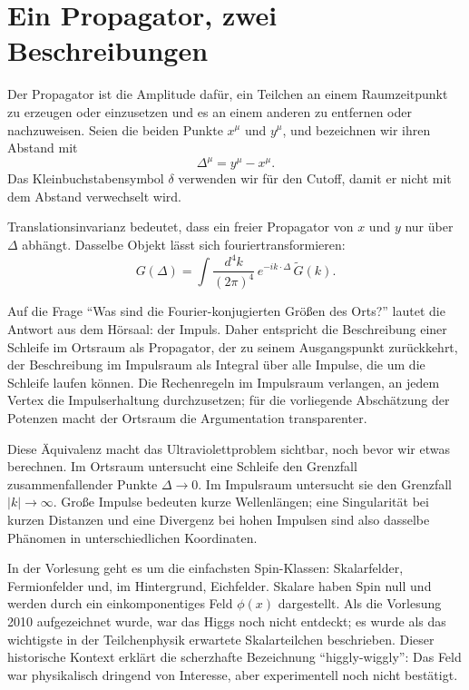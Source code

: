 \section{Ein Propagator, zwei Beschreibungen}

Der Propagator ist die Amplitude dafür, ein Teilchen an einem Raumzeitpunkt zu erzeugen oder einzusetzen und es an einem anderen zu entfernen oder nachzuweisen. Seien die beiden Punkte \(x^\mu\) und \(y^\mu\), und bezeichnen wir ihren Abstand mit
\begin{equation}
\Delta^\mu=y^\mu-x^\mu.
\end{equation}
Das Kleinbuchstabensymbol \(\delta\) verwenden wir für den Cutoff, damit er nicht mit dem Abstand verwechselt wird.

Translationsinvarianz bedeutet, dass ein freier Propagator von \(x\) und \(y\) nur über \(\Delta\) abhängt. Dasselbe Objekt lässt sich fouriertransformieren:
\begin{equation}
G(\Delta)
=\int\frac{d^4k}{(2\pi)^4}\,e^{-ik\cdot\Delta}\,\widetilde G(k).
\end{equation}

Auf die Frage ``Was sind die Fourier-konjugierten Größen des Orts?'' lautet die Antwort aus dem Hörsaal: der Impuls. Daher entspricht die Beschreibung einer Schleife im Ortsraum als Propagator, der zu seinem Ausgangspunkt zurückkehrt, der Beschreibung im Impulsraum als Integral über alle Impulse, die um die Schleife laufen können. Die Rechenregeln im Impulsraum verlangen, an jedem Vertex die Impulserhaltung durchzusetzen; für die vorliegende Abschätzung der Potenzen macht der Ortsraum die Argumentation transparenter.

Diese Äquivalenz macht das Ultraviolettproblem sichtbar, noch bevor wir etwas berechnen. Im Ortsraum untersucht eine Schleife den Grenzfall zusammenfallender Punkte \(\Delta\to0\). Im Impulsraum untersucht sie den Grenzfall \(|k|\to\infty\). Große Impulse bedeuten kurze Wellenlängen; eine Singularität bei kurzen Distanzen und eine Divergenz bei hohen Impulsen sind also dasselbe Phänomen in unterschiedlichen Koordinaten.

In der Vorlesung geht es um die einfachsten Spin-Klassen: Skalarfelder, Fermionfelder und, im Hintergrund, Eichfelder. Skalare haben Spin null und werden durch ein einkomponentiges Feld \(\phi(x)\) dargestellt. Als die Vorlesung 2010 aufgezeichnet wurde, war das Higgs noch nicht entdeckt; es wurde als das wichtigste in der Teilchenphysik erwartete Skalarteilchen beschrieben. Dieser historische Kontext erklärt die scherzhafte Bezeichnung ``higgly-wiggly'': Das Feld war physikalisch dringend von Interesse, aber experimentell noch nicht bestätigt.

